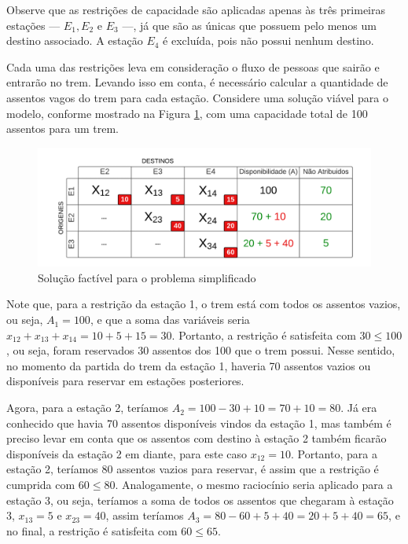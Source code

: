 Observe que as restrições de capacidade são aplicadas apenas às três primeiras estações — $E_1, E_2$ e $E_3$ —, já que são as únicas que possuem pelo menos um destino associado. A estação $E_4$ é excluída, pois não possui nenhum destino.

Cada uma das restrições leva em consideração o fluxo de pessoas que sairão e entrarão no trem. Levando isso em conta, é necessário calcular a quantidade de assentos vagos do trem para cada estação. Considere uma solução viável para o modelo, conforme mostrado na Figura \ref{fig: fig2}, com uma capacidade total de 100 assentos para um trem.

\begin{figure}[H]
	\begin{center}
		\includegraphics[scale=0.4]{img/fig2.png}
		\caption{Solução factível para o problema simplificado}
		\label{fig: fig2}
	\end{center}
\end{figure}
\vspace{-1cm}

Note que, para a restrição da estação 1, o trem está com todos os assentos vazios, ou seja, \(A_1=100\), e que a soma das variáveis seria \(x_{12} + x_{13} + x_{14} = 10 + 5 + 15 = 30\). Portanto, a restrição é satisfeita com \(30 \leq 100\), ou seja, foram reservados 30 assentos dos 100 que o trem possui. Nesse sentido, no momento da partida do trem da estação 1, haveria 70 assentos vazios ou disponíveis para reservar em estações posteriores.

Agora, para a estação 2, teríamos \(A_2 = 100 - 30 + 10 = 70 + 10 = 80\). Já era conhecido que havia 70 assentos disponíveis vindos da estação 1, mas também é preciso levar em conta que os assentos com destino à estação 2 também ficarão disponíveis da estação 2 em diante, para este caso \(x_{12} = 10\). Portanto, para a estação 2, teríamos 80 assentos vazios para reservar, é assim que a restrição é cumprida com \(60 \leq 80\). Analogamente, o mesmo raciocínio seria aplicado para a estação 3, ou seja, teríamos a soma de todos os assentos que chegaram à estação 3, \(x_{13} = 5\) e \(x_{23} = 40\), assim teríamos \(A_3 = 80 - 60 + 5 + 40 = 20 + 5 + 40 = 65\), e no final, a restrição é satisfeita com \(60 \leq 65\).


